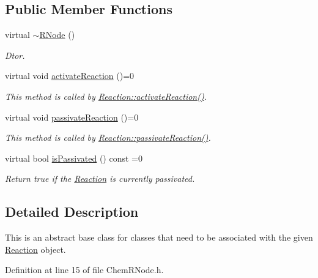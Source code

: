 \subsection*{Public Member Functions}
\begin{DoxyCompactItemize}
\item 
virtual \hyperlink{classchem_1_1RNode_af39a9d08d697b5586dad42ce763b902d}{$\sim$\-R\-Node} ()
\begin{DoxyCompactList}\small\item\em Dtor. \end{DoxyCompactList}\item 
virtual void \hyperlink{classchem_1_1RNode_a979370f4102fdfda1ee562788318b556}{activate\-Reaction} ()=0
\begin{DoxyCompactList}\small\item\em This method is called by \hyperlink{classchem_1_1ReactionBase_aeb6c8f208d4c6ed1e0149090647eb035}{Reaction\-::activate\-Reaction()}. \end{DoxyCompactList}\item 
virtual void \hyperlink{classchem_1_1RNode_a007a65ede4d89e562929fc0ae9df5661}{passivate\-Reaction} ()=0
\begin{DoxyCompactList}\small\item\em This method is called by \hyperlink{classchem_1_1ReactionBase_a9fe4cf91fcff8c4aea65e759841c28fe}{Reaction\-::passivate\-Reaction()}. \end{DoxyCompactList}\item 
virtual bool \hyperlink{classchem_1_1RNode_a30bdb95406ebc217c1a732bf36883b3f}{is\-Passivated} () const =0
\begin{DoxyCompactList}\small\item\em Return true if the \hyperlink{classchem_1_1Reaction}{Reaction} is currently passivated. \end{DoxyCompactList}\end{DoxyCompactItemize}


\subsection{Detailed Description}
This is an abstract base class for classes that need to be associated with the given \hyperlink{classchem_1_1Reaction}{Reaction} object. 

Definition at line 15 of file Chem\-R\-Node.\-h.



